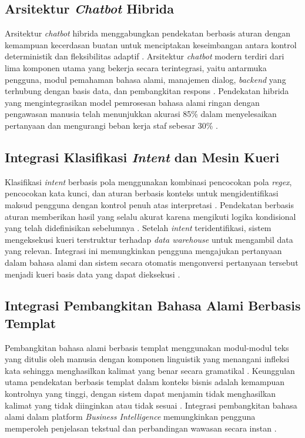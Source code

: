 \subsection{Arsitektur \textit{Chatbot} Hibrida}

Arsitektur \textit{chatbot} hibrida menggabungkan pendekatan berbasis aturan dengan kemampuan kecerdasan buatan untuk menciptakan keseimbangan antara kontrol deterministik dan fleksibilitas adaptif \autocite{ijirt2024rulebased}. Arsitektur \textit{chatbot} modern terdiri dari lima komponen utama yang bekerja secara terintegrasi, yaitu antarmuka pengguna, modul pemahaman bahasa alami, manajemen dialog, \textit{backend} yang terhubung dengan basis data, dan pembangkitan respons \autocite{huang2021chatbot}. Pendekatan hibrida yang mengintegrasikan model pemrosesan bahasa alami ringan dengan pengawasan manusia telah menunjukkan akurasi 85\% dalam menyelesaikan pertanyaan dan mengurangi beban kerja staf sebesar 30\% \autocite{bamurange2025hybrid}.

\subsection{Integrasi Klasifikasi \textit{Intent} dan Mesin Kueri}

Klasifikasi \textit{intent} berbasis pola menggunakan kombinasi pencocokan pola \textit{regex}, pencocokan kata kunci, dan aturan berbasis konteks untuk mengidentifikasi maksud pengguna dengan kontrol penuh atas interpretasi \autocite{ijirt2024rulebased}. Pendekatan berbasis aturan memberikan hasil yang selalu akurat karena mengikuti logika kondisional yang telah didefinisikan sebelumnya \autocite{ibm2025chatbottypes}. Setelah \textit{intent} teridentifikasi, sistem mengeksekusi kueri terstruktur terhadap \textit{data warehouse} untuk mengambil data yang relevan. Integrasi ini memungkinkan pengguna mengajukan pertanyaan dalam bahasa alami dan sistem secara otomatis mengonversi pertanyaan tersebut menjadi kueri basis data yang dapat dieksekusi \autocite{querio2025conversational}.

\subsection{Integrasi Pembangkitan Bahasa Alami Berbasis Templat}

Pembangkitan bahasa alami berbasis templat menggunakan modul-modul teks yang ditulis oleh manusia dengan komponen linguistik yang menangani infleksi kata sehingga menghasilkan kalimat yang benar secara gramatikal \autocite{retresco2024nlgtemplate}. Keunggulan utama pendekatan berbasis templat dalam konteks bisnis adalah kemampuan kontrolnya yang tinggi, dengan sistem dapat menjamin tidak menghasilkan kalimat yang tidak diinginkan atau tidak sesuai \autocite{retresco2024nlgtemplate}. Integrasi pembangkitan bahasa alami dalam platform \textit{Business Intelligence} memungkinkan pengguna memperoleh penjelasan tekstual dan perbandingan wawasan secara instan \autocite{yellowfin2025nlg}.


